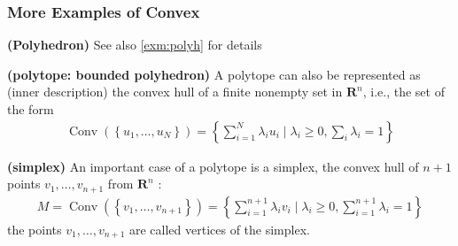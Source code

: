\documentclass{article}
\newcommand{\bfs}[1]{\textbf{({#1}) }}
\begin{document}
\subsubsection{More Examples of Convex}
\begin{defa}{\bfs{Polyhedron}}
 See also  \cref{exm:polyh} for details
\end{defa}

\begin{exma}{\bfs{polytope: bounded polyhedron}}
A polytope can also be represented as (inner description) the convex hull of a finite nonempty set in $\mathbf{R}^{n}$, i.e., the set of the form
\begin{align*}
\operatorname{Conv}\left(\left\{u_{1}, \ldots, u_{N}\right\}\right)=\left\{\sum_{i=1}^{N} \lambda_{i} u_{i} \mid \lambda_{i} \geq 0, \sum_{i} \lambda_{i}=1\right\}
\end{align*}

\end{exma}
\begin{exma}{\bfs{simplex}}
 An important case of a polytope is a simplex, the convex hull of $n+1$  points $v_{1}, \ldots, v_{n+1}$ from $\mathbf{R}^{n}$ :
\begin{align*}
M=\operatorname{Conv}\left(\left\{v_{1}, \ldots, v_{n+1}\right\}\right)=\left\{\sum_{i=1}^{n+1} \lambda_{i} v_{i} \mid \lambda_{i} \geq 0, \sum_{i=1}^{n+1} \lambda_{i}=1\right\}
\end{align*}
the points $v_{1}, \ldots, v_{n+1}$ are called vertices of the simplex.
\end{exma}
\end{document}
